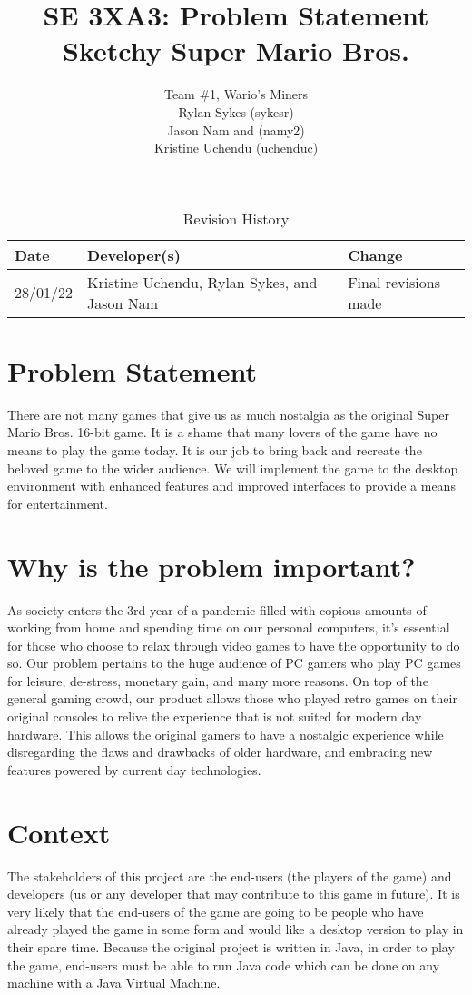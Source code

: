 \documentclass{article}
\title{SE 3XA3: Problem Statement\\Sketchy Super Mario Bros.}
\author{Team \#1, Wario's Miners
		\\ Rylan Sykes (sykesr)
		\\ Jason Nam and (namy2)
		\\ Kristine Uchendu (uchenduc)
}
\date{}
\begin{document}
\begin{table}[hp]
\caption{Revision History} \label{TblRevisionHistory}
\begin{tabularx}{\textwidth}{llX}
\toprule
\textbf{Date} & \textbf{Developer(s)} & \textbf{Change}\\
\midrule
28/01/22 & Kristine Uchendu, Rylan Sykes, and Jason Nam & Final revisions made\\
\bottomrule
\end{tabularx}
\end{table}

\newpage

\maketitle

\section{Problem Statement}
    There are not many games that give us as much nostalgia as the original Super Mario Bros. 16-bit game. It is a shame that many lovers of the game have no means to play the game today. It is our job to bring back and recreate the beloved game to the wider audience. We will implement the game to the desktop environment with enhanced features and improved interfaces to provide a means for entertainment.

\section{Why is the problem important?}
    As society enters the 3rd year of a pandemic filled with copious amounts of working from home and spending time on our personal computers, it’s essential for those who choose to relax through video games to have the opportunity to do so. Our problem pertains to the huge audience of PC gamers who play PC games for leisure, de-stress, monetary gain, and many more reasons. On top of the general gaming crowd, our product allows those who played retro games on their original consoles to relive the experience that is not suited for modern day hardware. This allows the original gamers to have a nostalgic experience while disregarding the flaws and drawbacks of older hardware, and embracing new features powered by current day technologies.

\section{Context}
    The stakeholders of this project are the end-users (the players of the game) and developers (us or any developer that may contribute to this game in future). It is very likely that the end-users of the game are going to be people who have already played the game in some form and would like a desktop version to play in their spare time. Because the original project is written in Java, in order to play the game, end-users must be able to run Java code which can be done on any machine with a Java Virtual Machine.
    
\end{document}
